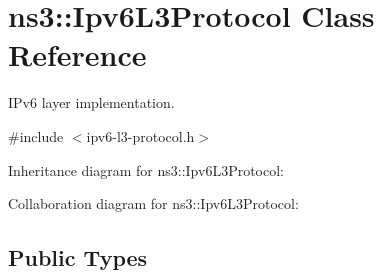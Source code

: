 \hypertarget{classns3_1_1Ipv6L3Protocol}{}\section{ns3\+:\+:Ipv6\+L3\+Protocol Class Reference}
\label{classns3_1_1Ipv6L3Protocol}


I\+Pv6 layer implementation.  




{\ttfamily \#include $<$ipv6-\/l3-\/protocol.\+h$>$}



Inheritance diagram for ns3\+:\+:Ipv6\+L3\+Protocol\+:


Collaboration diagram for ns3\+:\+:Ipv6\+L3\+Protocol\+:
\subsection*{Public Types}
